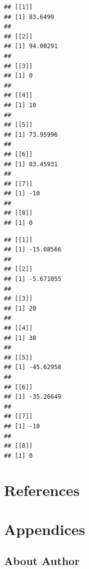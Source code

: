 \documentclass[
]{article}
\newenvironment{Shaded}{\begin{snugshade}}{\end{snugshade}}
\newcommand{\ControlFlowTok}[1]{\textcolor[rgb]{0.13,0.29,0.53}{\textbf{#1}}}
\newcommand{\FunctionTok}[1]{\textcolor[rgb]{0.00,0.00,0.00}{#1}}
\newcommand{\NormalTok}[1]{#1}
\newcommand{\SpecialCharTok}[1]{\textcolor[rgb]{0.00,0.00,0.00}{#1}}
\newcommand{\StringTok}[1]{\textcolor[rgb]{0.31,0.60,0.02}{#1}}
\begin{document}
\begin{verbatim}
## [[1]]
## [1] 83.6499
## 
## [[2]]
## [1] 94.00291
## 
## [[3]]
## [1] 0
## 
## [[4]]
## [1] 10
## 
## [[5]]
## [1] 73.95996
## 
## [[6]]
## [1] 83.45931
## 
## [[7]]
## [1] -10
## 
## [[8]]
## [1] 0
\end{verbatim}

\begin{Shaded}
\end{Shaded}

\begin{verbatim}
## [[1]]
## [1] -15.08566
## 
## [[2]]
## [1] -5.671055
## 
## [[3]]
## [1] 20
## 
## [[4]]
## [1] 30
## 
## [[5]]
## [1] -45.62958
## 
## [[6]]
## [1] -35.26649
## 
## [[7]]
## [1] -10
## 
## [[8]]
## [1] 0
\end{verbatim}

\hypertarget{references}{%
\section*{References}\label{references}}

\hypertarget{appendices}{%
\section*{Appendices}\label{appendices}}

\hypertarget{about-author}{%
\subsection*{About Author}\label{about-author}}
\end{document}
